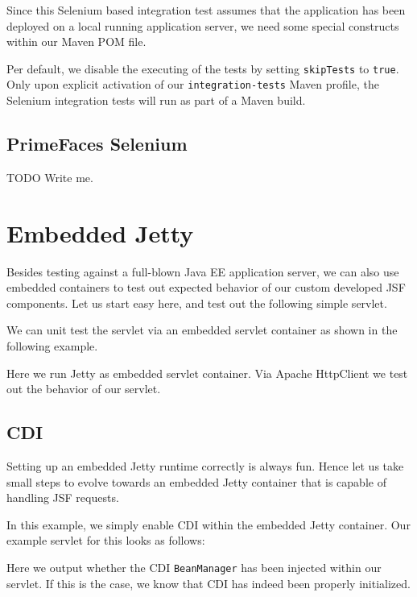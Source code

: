 Since this Selenium based integration test assumes that the application has been deployed on a local running application server, we need some special constructs within our Maven POM file.

Per default, we disable the executing of the tests by setting \texttt{skipTests} to \texttt{true}.
Only upon explicit activation of our \texttt{integration-tests} Maven profile,
the Selenium integration tests will run as part of a Maven build.

\subsection{PrimeFaces Selenium}
\begin{TODO}{TODO}
	Write me.
\end{TODO}

\section{Embedded Jetty}
Besides testing against a full-blown Java EE application server, we can also use embedded containers to test out expected behavior of our custom developed JSF components.
Let us start easy here, and test out the following simple servlet.


We can unit test the servlet via an embedded servlet container as shown in the following example.

Here we run Jetty \cite{jetty} as embedded servlet container.
Via Apache HttpClient \cite{httpclient} we test out the behavior of our servlet.

\subsection{CDI}
Setting up an embedded Jetty runtime correctly is always fun.
Hence let us take small steps to evolve towards an embedded Jetty container that is capable of handling JSF requests.

In this example, we simply enable CDI within the embedded Jetty container.
Our example servlet for this looks as follows:

Here we output whether the CDI \texttt{BeanManager} has been injected within our servlet.
If this is the case, we know that CDI has indeed been properly initialized.

